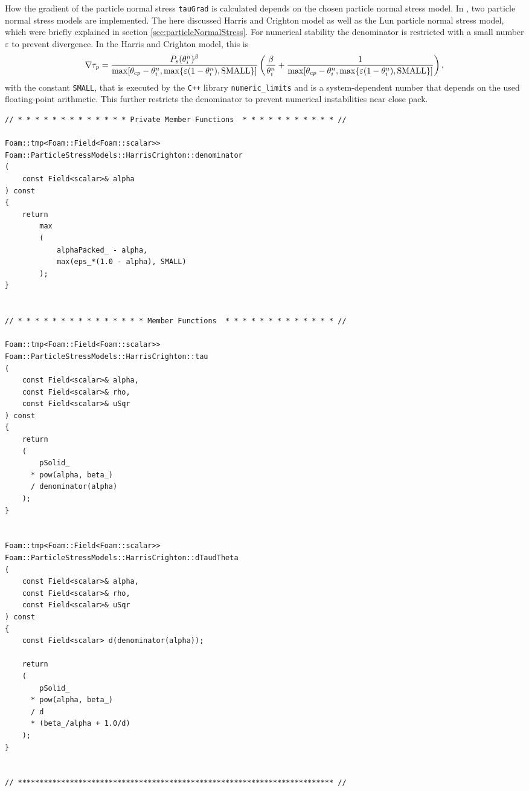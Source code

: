 How the gradient of the particle normal stress \lstinline|tauGrad| is calculated depends on the chosen particle normal stress model.
In \OFns, two particle normal stress models are implemented.
The here discussed Harris and Crighton model
as well as the Lun particle normal stress model, which were briefly explained in section \ref{sec:particleNormalStress}. 
For numerical stability the denominator is restricted with a small number $\varepsilon$ to prevent divergence.
In the Harris and Crighton model, this is 
\begin{equation}
    \nabla \tau_p = 
    \dfrac{P_s (\theta_i^n)^\beta}{\max [\theta_{cp} - \theta_i^n, \max \{\varepsilon (1 - \theta_i^n), \operatorname{SMALL} \}]} 
    \left(\dfrac{\beta}{\theta_i^n} + \dfrac{1}{\max [\theta_{cp} - \theta_i^n, \max \{\varepsilon (1 - \theta_i^n), \operatorname{SMALL} \}]} \right),
\end{equation}
with the constant \lstinline|SMALL|, that is executed by the \lstinline|C++| library \verb|numeric_limits| and is a system-dependent number that depends on the used floating-point arithmetic.
This further restricts the denominator to prevent numerical instabilities near close pack.


\ifcode
\begin{lstlisting}[firstline=81,caption = intermediate/submodels/MPPIC/ParticleStressModels/HarrisCrighton/HarrisCrighton.C,label={code:HarrisCrighton}]
    // * * * * * * * * * * * * * Private Member Functions  * * * * * * * * * * * //

Foam::tmp<Foam::Field<Foam::scalar>>
Foam::ParticleStressModels::HarrisCrighton::denominator
(
    const Field<scalar>& alpha
) const
{
    return
        max
        (
            alphaPacked_ - alpha,
            max(eps_*(1.0 - alpha), SMALL)
        );
}


// * * * * * * * * * * * * * * * Member Functions  * * * * * * * * * * * * * //

Foam::tmp<Foam::Field<Foam::scalar>>
Foam::ParticleStressModels::HarrisCrighton::tau
(
    const Field<scalar>& alpha,
    const Field<scalar>& rho,
    const Field<scalar>& uSqr
) const
{
    return
    (
        pSolid_
      * pow(alpha, beta_)
      / denominator(alpha)
    );
}


Foam::tmp<Foam::Field<Foam::scalar>>
Foam::ParticleStressModels::HarrisCrighton::dTaudTheta
(
    const Field<scalar>& alpha,
    const Field<scalar>& rho,
    const Field<scalar>& uSqr
) const
{
    const Field<scalar> d(denominator(alpha));

    return
    (
        pSolid_
      * pow(alpha, beta_)
      / d
      * (beta_/alpha + 1.0/d)
    );
}


// ************************************************************************* //

\end{lstlisting}

